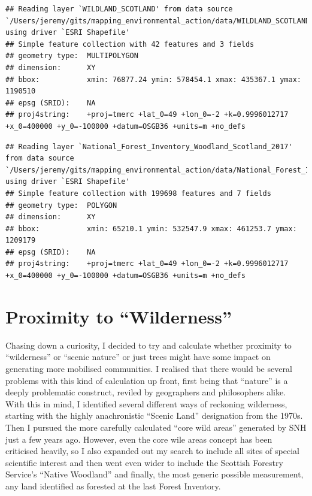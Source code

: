 \documentclass[11pt,]{article}
\begin{document}
\begin{verbatim}
## Reading layer `WILDLAND_SCOTLAND' from data source `/Users/jeremy/gits/mapping_environmental_action/data/WILDLAND_SCOTLAND.shp' using driver `ESRI Shapefile'
## Simple feature collection with 42 features and 3 fields
## geometry type:  MULTIPOLYGON
## dimension:      XY
## bbox:           xmin: 76877.24 ymin: 578454.1 xmax: 435367.1 ymax: 1190510
## epsg (SRID):    NA
## proj4string:    +proj=tmerc +lat_0=49 +lon_0=-2 +k=0.9996012717 +x_0=400000 +y_0=-100000 +datum=OSGB36 +units=m +no_defs
\end{verbatim}

\begin{verbatim}
## Reading layer `National_Forest_Inventory_Woodland_Scotland_2017' from data source `/Users/jeremy/gits/mapping_environmental_action/data/National_Forest_Inventory_Woodland_Scotland_2017.shp' using driver `ESRI Shapefile'
## Simple feature collection with 199698 features and 7 fields
## geometry type:  POLYGON
## dimension:      XY
## bbox:           xmin: 65210.1 ymin: 532547.9 xmax: 461253.7 ymax: 1209179
## epsg (SRID):    NA
## proj4string:    +proj=tmerc +lat_0=49 +lon_0=-2 +k=0.9996012717 +x_0=400000 +y_0=-100000 +datum=OSGB36 +units=m +no_defs
\end{verbatim}

\hypertarget{proximity-to-wilderness}{%
\section{Proximity to ``Wilderness''}\label{proximity-to-wilderness}}

Chasing down a curiosity, I decided to try and calculate whether
proximity to ``wilderness'' or ``scenic nature'' or just trees might
have some impact on generating more mobilised communities. I realised
that there would be several problems with this kind of calculation up
front, first being that ``nature'' is a deeply problematic construct,
reviled by geographers and philosophers alike. With this in mind, I
identified several different ways of reckoning wilderness, starting with
the highly anachronistic ``Scenic Land'' designation from the 1970s.
Then I pursued the more carefully calculated ``core wild areas''
generated by SNH just a few years ago. However, even the core wile areas
concept has been criticised heavily, so I also expanded out my search to
include all sites of special scientific interest and then went even
wider to include the Scottish Forestry Service's ``Native Woodland'' and
finally, the most generic possible measurement, any land identified as
forested at the last Forest Inventory.
\end{document}
